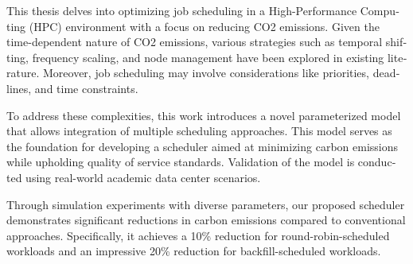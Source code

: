 \null\vfil
\begin{otherlanguage}{ngerman}
\begin{center}\textsf{\textbf{\abstractname}}\end{center}

\noindent 

This thesis delves into optimizing job scheduling in a High-Performance Computing (HPC) environment with a focus on reducing CO2 emissions. Given the time-dependent nature of CO2 emissions, various strategies such as temporal shifting, frequency scaling, and node management have been explored in existing literature. Moreover, job scheduling may involve considerations like priorities, deadlines, and time constraints.

To address these complexities, this work introduces a novel parameterized model that allows integration of multiple scheduling approaches. This model serves as the foundation for developing a scheduler aimed at minimizing carbon emissions while upholding quality of service standards. Validation of the model is conducted using real-world academic data center scenarios.

Through simulation experiments with diverse parameters, our proposed scheduler demonstrates significant reductions in carbon emissions compared to conventional approaches. Specifically, it achieves a 10\% reduction for round-robin-scheduled workloads and an impressive 20\% reduction for backfill-scheduled workloads.





\end{otherlanguage}
\vfil\null



